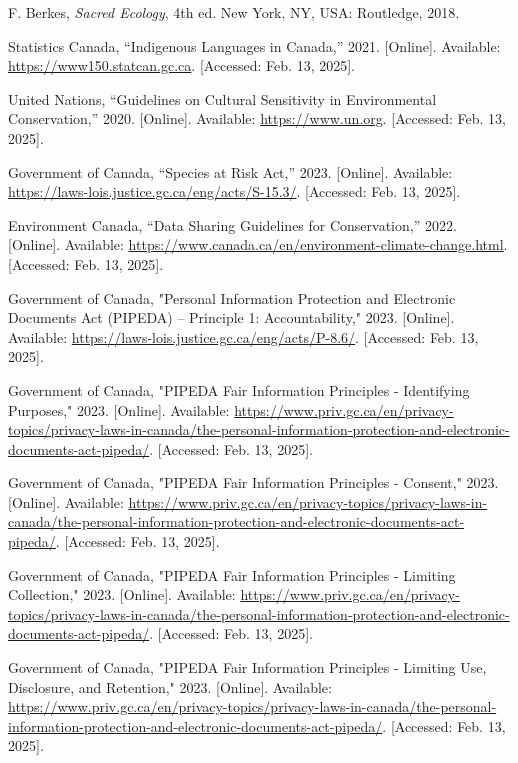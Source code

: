 \documentclass[]{article}
\begin{document}
\begin{thebibliography}{9}
     F. Berkes, \textit{Sacred Ecology}, 4th ed. New York, NY, USA: Routledge, 2018.

     Statistics Canada, “Indigenous Languages in Canada,” 2021. [Online]. Available: \url{https://www150.statcan.gc.ca}. [Accessed: Feb. 13, 2025].

     United Nations, “Guidelines on Cultural Sensitivity in Environmental Conservation,” 2020. [Online]. Available: \url{https://www.un.org}. [Accessed: Feb. 13, 2025].

     Government of Canada, “Species at Risk Act,” 2023. [Online]. Available: \url{https://laws-lois.justice.gc.ca/eng/acts/S-15.3/}. [Accessed: Feb. 13, 2025].

     Environment Canada, “Data Sharing Guidelines for Conservation,” 2022. [Online]. Available: \url{https://www.canada.ca/en/environment-climate-change.html}. [Accessed: Feb. 13, 2025].

     Government of Canada, "Personal Information Protection and Electronic Documents Act (PIPEDA) – Principle 1: Accountability," 2023. [Online]. Available: \url{https://laws-lois.justice.gc.ca/eng/acts/P-8.6/}. [Accessed: Feb. 13, 2025].

     Government of Canada, "PIPEDA Fair Information Principles - Identifying Purposes," 2023. [Online]. Available: \url{https://www.priv.gc.ca/en/privacy-topics/privacy-laws-in-canada/the-personal-information-protection-and-electronic-documents-act-pipeda/}. [Accessed: Feb. 13, 2025].

     Government of Canada, "PIPEDA Fair Information Principles - Consent," 2023. [Online]. Available: \url{https://www.priv.gc.ca/en/privacy-topics/privacy-laws-in-canada/the-personal-information-protection-and-electronic-documents-act-pipeda/}. [Accessed: Feb. 13, 2025].

     Government of Canada, "PIPEDA Fair Information Principles - Limiting Collection," 2023. [Online]. Available: \url{https://www.priv.gc.ca/en/privacy-topics/privacy-laws-in-canada/the-personal-information-protection-and-electronic-documents-act-pipeda/}. [Accessed: Feb. 13, 2025].

     Government of Canada, "PIPEDA Fair Information Principles - Limiting Use, Disclosure, and Retention," 2023. [Online]. Available: \url{https://www.priv.gc.ca/en/privacy-topics/privacy-laws-in-canada/the-personal-information-protection-and-electronic-documents-act-pipeda/}. [Accessed: Feb. 13, 2025].


\end{thebibliography}
\end{document}
